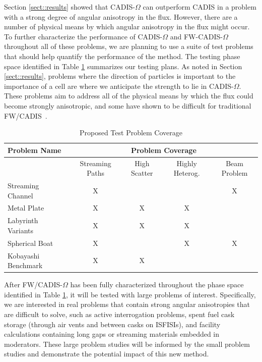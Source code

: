 \documentclass[12pt]{article}
\begin{document}
Section \ref{sect::results} showed that CADIS-$\Omega$ can outperform CADIS in a problem with a strong degree of angular anisotropy in the flux. However, there are a number of physical means by which angular anisotropy in the flux might occur. To further characterize the performance of CADIS-$\Omega$ and FW-CADIS-$\Omega$ throughout all of these problems, we are planning to use a suite of test problems that should help quantify the performance of the method. The testing phase space identified in Table \ref{tab:testprobs} summarizes our testing plans. As noted in Section \ref{sect::results}, problems where the direction of particles is important to the importance of a cell are where we anticipate the strength to lie in CADIS-$\Omega$. These problems aim to address all of the physical means by which the flux could become strongly anisotropic, and some have shown to be difficult for traditional FW/CADIS~\citep{Peplow-ORNL}. 

 \begin{table}
  \centering
  \caption{Proposed Test Problem Coverage}
  \begin{tabular}{l|cccc}
    \toprule
    Problem Name & \multicolumn{4}{c}{Problem Coverage} \\
    \hline
     & Streaming Paths & High Scatter & Highly Heterog. & Beam Problem \\
    \hline
    Streaming Channel   & X & & & X \\ 
    Metal Plate         & X & X & X &  \\
    Labyrinth Variants  & X & X & X &  \\ 
    Spherical Boat      & X & & X & X \\  
    Kobayashi Benchmark & X & X &  &  \\   
	\bottomrule
  \end{tabular}
  \label{tab:testprobs}
\end{table}

After FW/CADIS-$\Omega$ has been fully characterized throughout the phase space identified in Table \ref{tab:testprobs}, it will be tested with large problems of interest. 
Specifically, we are interested in real problems that contain strong angular anisotropies that are difficult to solve, such as active interrogation problems, spent fuel cask storage (through air vents and between casks on ISFISIs), and facility calculations containing long gaps or streaming materials embedded in moderators. 
These large problem studies will be informed by the small problem studies and demonstrate the potential impact of this new method. 
\end{document}
